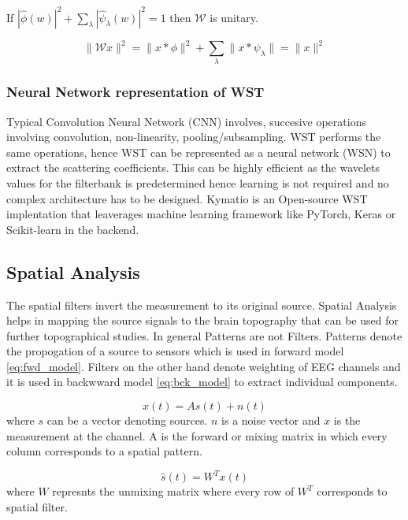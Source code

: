 If $|\hat{\phi}(w)|^2 + \sum_{\lambda} | \hat{\psi}_{\lambda}(w)|^2 = 1$ then $\mathcal{W}$ is unitary.

\begin{equation}    
    \|\mathcal{W}x\|^2 = \|x\ast\phi\|^2 + \sum_{\lambda}\| x \ast \psi_\lambda\| = \|x\|^2
\end{equation}

 \subsubsection{Neural Network representation of WST}
 Typical Convolution Neural Network (CNN) involves, succesive operations involving convolution, non-linearity, pooling/subsampling. WST performs the same operations, hence WST can be represented as a neural network (WSN) to extract the scattering coefficients. This can be highly efficient as the wavelets values for the filterbank is predetermined hence learning is not required and no complex architecture has to be designed. Kymatio is an Open-source WST implentation that leaverages machine learning framework like PyTorch, Keras or Scikit-learn in the backend.

\subsection{Spatial Analysis}
The spatial filters invert the measurement to its original source. Spatial Analysis helps in mapping the source signals to the brain topography that can be used for further topographical studies. In general Patterns are not Filters. Patterns denote the propogation of a source to sensors which is used in forward model \ref*{eq:fwd_model}. Filters on the other hand denote weighting of EEG channels and it is used in backwward model \ref*{eq:bck_model} to extract individual components.

\begin{equation} \label{eq:fwd_model}
    x(t) = A s(t) +n(t)
\end{equation}
where $s$ can be a vector denoting sources. $n$ is a noise vector and $x$ is the measurement at the channel. A is the forward or mixing matrix in which every column corresponds to a spatial pattern.

\begin{equation} \label{eq:bck_model}
    \hat{s}(t) = W^T x(t)
\end{equation}
where $W$ represnts the unmixing matrix where every row of $W^T$ corresponds to spatial filter.

